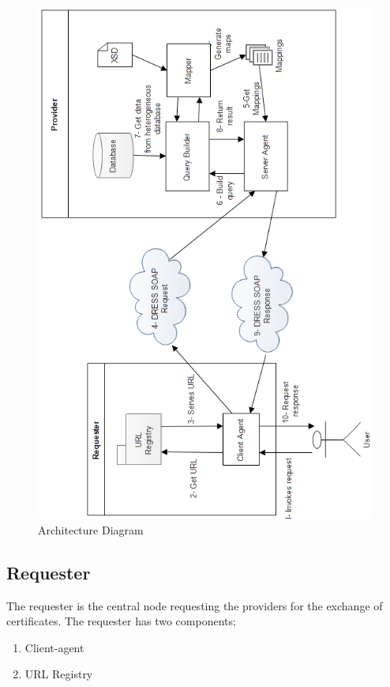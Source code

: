 \documentclass[12pt,a4paper,oneside]{book}
\begin{document}
\begin{figure}[!htp]
  \centering
  \includegraphics[width=14cm]{architecture.png}
  \caption{Architecture Diagram}
  \label{fig:architecture}
\end{figure}

	\subsection{Requester}
	The requester is the central node requesting the providers for the exchange of certificates. The requester has two components; 

\begin{enumerate}
\item Client-agent
\item URL Registry 
\end{enumerate}
\end{document}
